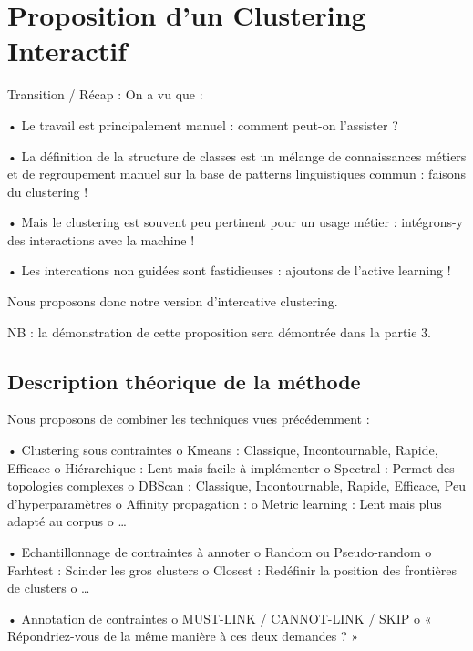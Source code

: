 \chapter{Proposition d'un Clustering Interactif}
    \label{chapter:2_CLUSTERING_INTERACTIF}

    \minitoc

    Transition / Récap : On a vu que :
    
    •	Le travail est principalement manuel : comment peut-on l’assister ?
    
    •	La définition de la structure de classes est un mélange de connaissances métiers et de regroupement manuel sur la base de patterns linguistiques commun : faisons du clustering !
    
    •	Mais le clustering est souvent peu pertinent pour un usage métier : intégrons-y des interactions avec la machine !
    
    •	Les intercations non guidées sont fastidieuses : ajoutons de l’active learning !

    Nous proposons donc notre version d'intercative clustering.

    NB : la démonstration de cette proposition sera démontrée dans la partie 3.

    \section{Description théorique de la méthode}

        Nous proposons de combiner les techniques vues précédemment :

        •	Clustering sous contraintes
            o	Kmeans : Classique, Incontournable, Rapide, Efficace
            o	Hiérarchique : Lent mais facile à implémenter
            o	Spectral : Permet des topologies complexes
            o	DBScan : Classique, Incontournable, Rapide, Efficace, Peu d’hyperparamètres
            o	Affinity propagation : 
            o	Metric learning : Lent mais plus adapté au corpus
            o	…
    
        •	Echantillonnage de contraintes à annoter 
            o	Random ou Pseudo-random
            o	Farhtest : Scinder les gros clusters
            o	Closest : Redéfinir la position des frontières de clusters
            o	…
    
        •	Annotation de contraintes
            o	MUST-LINK / CANNOT-LINK / SKIP
            o	« Répondriez-vous de la même manière à ces deux demandes ? »

